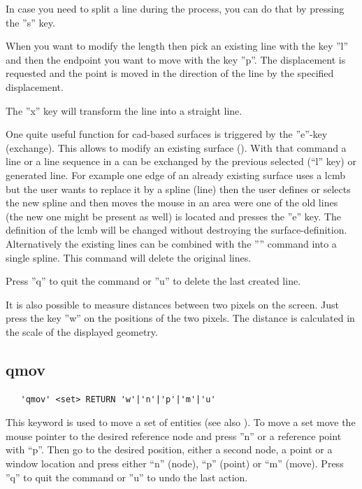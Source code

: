 \documentclass{article}
\begin{document}
In case you need to split a line during the process, you can do that by pressing the ''s'' key.

When you want to modify the length then pick an existing line with the key ''l'' and then the endpoint you want to move with the key ''p''. The displacement is requested and the point is moved in the direction of the line by the specified displacement. 

The ''x'' key will transform the line into a straight line.

One quite useful function for cad-based surfaces is triggered by the ''e''-key (exchange). This allows to modify an existing surface (). With that command a line or a line sequence in a  can be exchanged by the previous selected (``l'' key) or generated line. For example one edge of an already existing surface uses a lcmb but the user wants to replace it by a spline (line) then the user defines or selects the new spline and then moves the mouse in an area were one of the old lines (the new one might be present as well) is located and presses the ''e'' key. The definition of the lcmb will be changed without destroying the surface-definition. Alternatively the existing lines can be combined with the '''' command into a single spline. This command will delete the original lines.

Press ''q'' to quit the command or ''u'' to delete the last created line.



It is also possible to measure distances between two pixels on the screen. Just press the key ''w'' on the positions of the two pixels. The distance is calculated in the scale of the displayed geometry.


\subsection{\label{qmov}qmov}
\begin{verbatim}
   'qmov' <set> RETURN 'w'|'n'|'p'|'m'|'u'
\end{verbatim}
This keyword is used to move a set of entities (see also ). To move a set move the mouse pointer to the desired reference node and press ''n'' or a reference point with ``p''. Then go to the desired position, either a second node, a point or a window location and press either ``n'' (node), ``p'' (point) or ``m'' (move). Press ''q'' to quit the command or ''u'' to undo the last action. 
\end{document}
